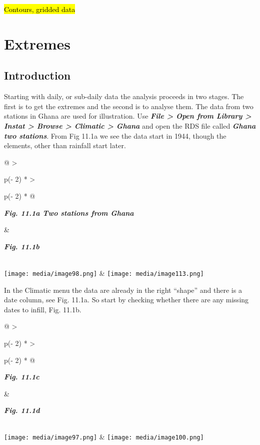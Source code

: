 \documentclass[
  letterpaper,
  DIV=11,
  numbers=noendperiod]{scrreprt}
\begin{document}
\hl{Contours, gridded data}


\chapter{Extremes}\label{extremes}

\section{Introduction}\label{introduction-10}

Starting with daily, or sub-daily data the analysis proceeds in two
stages. The first is to get the extremes and the second is to analyse
them. The data from two stations in Ghana are used for illustration. Use
\textbf{\emph{File \textgreater{} Open from Library \textgreater{}
Instat \textgreater{} Browse \textgreater{} Climatic \textgreater{}
Ghana}} and open the RDS file called \textbf{\emph{Ghana two stations}}.
From Fig 11.1a we see the data start in 1944, though the elements, other
than rainfall start later.

\begin{longtable}[]{@{}
  >{\raggedright\arraybackslash}p{(\columnwidth - 2\tabcolsep) * }
  >{\raggedright\arraybackslash}p{(\columnwidth - 2\tabcolsep) * }@{}}
\toprule\noalign{}
\begin{minipage}[b]{\linewidth}\raggedright
\textbf{\emph{Fig. 11.1a Two stations from Ghana}}
\end{minipage} & \begin{minipage}[b]{\linewidth}\raggedright
\textbf{\emph{Fig. 11.1b}}
\end{minipage} \\
\midrule\noalign{}
\endhead
\bottomrule\noalign{}
\endlastfoot
\texttt{[image: media/image98.png]} &
\texttt{[image: media/image113.png]} \\
\end{longtable}

In the Climatic menu the data are already in the right ``shape'' and
there is a date column, see Fig. 11.1a. So start by checking whether
there are any missing dates to infill, Fig. 11.1b.

\begin{longtable}[]{@{}
  >{\raggedright\arraybackslash}p{(\columnwidth - 2\tabcolsep) * }
  >{\raggedright\arraybackslash}p{(\columnwidth - 2\tabcolsep) * }@{}}
\toprule\noalign{}
\begin{minipage}[b]{\linewidth}\raggedright
\textbf{\emph{Fig. 11.1c}}
\end{minipage} & \begin{minipage}[b]{\linewidth}\raggedright
\textbf{\emph{Fig. 11.1d}}
\end{minipage} \\
\midrule\noalign{}
\endhead
\bottomrule\noalign{}
\endlastfoot
\texttt{[image: media/image97.png]} &
\texttt{[image: media/image100.png]} \\
\end{longtable}
\end{document}

